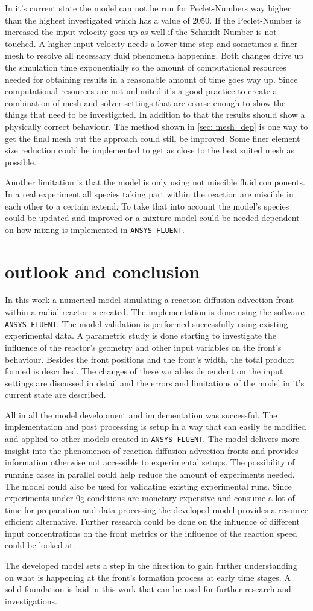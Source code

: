\documentclass[../thesis.tex]{subfiles}
\begin{document}
In it's current state the model can not be run for Peclet-Numbers way higher than the highest investigated which has a value of $2050$. If the Peclet-Number is increased the input velocity goes up as well if the Schmidt-Number is not touched. A higher input velocity needs a lower time step and sometimes a finer mesh to resolve all necessary fluid phenomena happening. Both changes drive up the simulation time exponentially so the amount of computational resources needed for obtaining results in a reasonable amount of time goes way up. Since computational resources are not unlimited it's a good practice to create a combination of mesh and solver settings that are coarse enough to show the things that need to be investigated. In addition to that the results should show a physically correct behaviour. The method shown in \autoref{sec: mesh_dep} is one way to get the final mesh but the approach could still be improved. Some finer element size reduction could be implemented to get as close to the best suited mesh as possible. 

Another limitation is that the model is only using not miscible fluid components. In a real experiment all species taking part within the reaction are miscible in each other to a certain extend. To take that into account the model's species could be updated and improved or a mixture model could be needed dependent on how mixing is implemented in \texttt{ANSYS FLUENT}. 

\chapter{outlook and conclusion}
\label{chp:out_con}

In this work a numerical model simulating a reaction diffusion advection front within a radial reactor is created. The implementation is done using the software \texttt{ANSYS FLUENT}. The model validation is performed successfully using existing experimental data. A parametric study is done starting to investigate the influence of the reactor's geometry and other input variables on the front's behaviour. Besides the front positions and the front's width, the total product formed is described. The changes of these variables dependent on the input settings are discussed in detail and the errors and limitations of the model in it's current state are described.

All in all the model development and implementation was successful. The implementation and post processing is setup in a way that can easily be modified and applied to other models created in \texttt{ANSYS FLUENT}. The model delivers more insight into the phenomenon of reaction-diffusion-advection fronts and provides information otherwise not accessible to experimental setups. The possibility of running cases in parallel could help reduce the amount of experiments needed. The model could also be used for validating existing experimental runs. Since experiments under 0g conditions are monetary expensive and consume a lot of time for preparation and data processing the developed model provides a resource efficient alternative. Further research could be done on the influence of different input concentrations on the front metrics or the influence of the reaction speed could be looked at.

The developed model sets a step in the direction to gain further understanding on what is happening at the front's formation process at early time stages. A solid foundation is laid in this work that can be used for further research and investigations.
\end{document}
